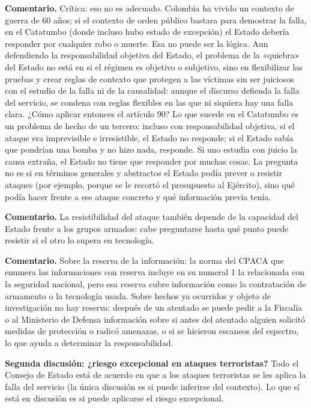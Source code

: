 \begin{comentario}
\textcolor[HTML]{8A6D3B}{\textbf{Comentario. }}Crítica: eso no es adecuado. Colombia ha vivido un contexto de guerra de 60 años; si el contexto de orden público bastara para demostrar la falla, en el Catatumbo (donde incluso hubo estado de excepción) el Estado debería responder por cualquier robo o muerte. Esa no puede ser la lógica. Aun defendiendo la responsabilidad objetiva del Estado, el problema de la «quiebra» del Estado no está en si el régimen es objetivo o subjetivo, sino en flexibilizar las pruebas y crear reglas de contexto que protegen a las víctimas sin ser juiciosos con el estudio de la falla ni de la causalidad: aunque el discurso defienda la falla del servicio, se condena con reglas flexibles en las que ni siquiera hay una falla clara. ¿Cómo aplicar entonces el artículo 90? Lo que sucede en el Catatumbo es un problema de hecho de un tercero: incluso con responsabilidad objetiva, si el ataque era imprevisible e irresistible, el Estado no responde; si el Estado sabía que pondrían una bomba y no hizo nada, responde. Si uno estudia con juicio la causa extraña, el Estado no tiene que responder por muchas cosas. La pregunta no es si en términos generales y abstractos el Estado podía prever o resistir ataques (por ejemplo, porque se le recortó el presupuesto al Ejército), sino qué podía hacer frente a ese ataque concreto y qué información previa tenía.
\par
\textcolor[HTML]{8A6D3B}{\textbf{Comentario. }}La resistibilidad del ataque también depende de la capacidad del Estado frente a los grupos armados: cabe preguntarse hasta qué punto puede resistir si el otro lo supera en tecnología.
\par
\textcolor[HTML]{8A6D3B}{\textbf{Comentario. }}Sobre la reserva de la información: la norma del CPACA que enumera las informaciones con reserva incluye en su numeral 1 la relacionada con la seguridad nacional, pero esa reserva cubre información como la contratación de armamento o la tecnología usada. Sobre hechos ya ocurridos y objeto de investigación no hay reserva: después de un atentado se puede pedir a la Fiscalía o al Ministerio de Defensa información sobre si antes del atentado alguien solicitó medidas de protección o radicó amenazas, o si se hicieron escaneos del espectro, lo que ayuda a determinar la responsabilidad.
\end{comentario}
\textbf{Segunda discusión: ¿riesgo excepcional en ataques terroristas?} Todo el Consejo de Estado está de acuerdo en que a los ataques terroristas se les aplica la falla del servicio (la única discusión es si puede inferirse del contexto). Lo que sí está en discusión es si puede aplicarse el riesgo excepcional.

